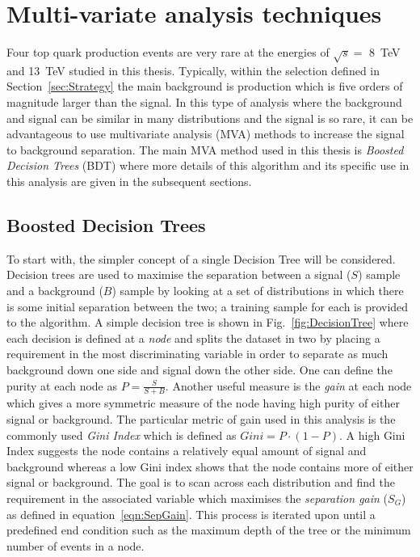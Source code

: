 \section{Multi-variate analysis techniques ~\label{sec:MVAtechniques}}

Four top quark production events are very rare at the energies of $\sqrt{s} = $ 8~TeV and 13~TeV studied in this thesis. Typically, within the selection defined in Section~\ref{sec:Strategy} the main background is \ttbar production which is five orders of magnitude larger than the \tttt signal. In this type of analysis where the background and signal can be similar in many distributions and the signal is so rare, it can be advantageous to use multivariate analysis (MVA) methods to increase the signal to background separation. The main MVA method used in this thesis is \emph{Boosted Decision Trees} (BDT) where more details of this algorithm and its specific use in this analysis are given in the subsequent sections.


\subsection{Boosted Decision Trees}
\label{sec:BDT}

To start with, the simpler concept of a single Decision Tree will be considered. Decision trees are used to maximise the separation between a signal ($S$) sample and a background ($B$) sample by looking at a set of distributions in which there is some initial separation between the two; a training sample for each is provided to the algorithm. A simple decision tree is shown in Fig.~\ref{fig:DecisionTree} where each decision is defined at a \emph{node} and splits the dataset in two by placing a requirement in the most discriminating variable in order to separate as much background down one side and signal down the other side.
One can define the purity at each node as $P=\frac{S}{S+B}$. Another useful measure is the \emph{gain} at each node which gives a more symmetric measure of the node having high purity of either signal or background. The particular metric of gain used in this analysis is the commonly used \emph{Gini Index} which is defined as $Gini = P\cdot\left(1-P\right)$. A high Gini Index suggests the node contains a relatively equal amount of signal and background whereas a low Gini index shows that the node contains more of either signal or background. 
The goal is to scan across each distribution and find the requirement in the associated variable which maximises the \emph{separation gain} ($S_{G}$) as defined in equation~\ref{eqn:SepGain}. This process is iterated upon until a predefined end condition such as the maximum depth of the tree or the minimum number of events in a node.


